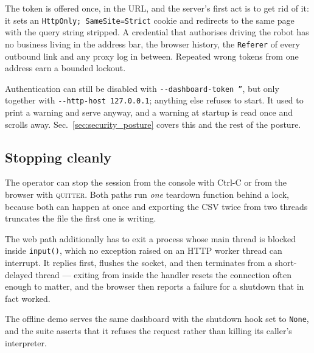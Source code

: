 The token is offered once, in the URL, and the server's first act is to
get rid of it: it sets an \texttt{HttpOnly; SameSite=Strict} cookie and
redirects to the same page with the query string stripped. A credential
that authorises driving the robot has no business living in the address
bar, the browser history, the \texttt{Referer} of every outbound link
and any proxy log in between. Repeated wrong tokens from one address
earn a bounded lockout.

Authentication can still be disabled with
\texttt{-{}-dashboard-token ''}, but only together with
\texttt{-{}-http-host 127.0.0.1}; anything else refuses to start. It
used to print a warning and serve anyway, and a warning at startup is
read once and scrolls away. Sec.~\ref{sec:security_posture} covers this
and the rest of the posture.

\subsection{Stopping cleanly}

The operator can stop the session from the console with Ctrl-C or from
the browser with \textsc{quitter}. Both paths run \emph{one} teardown
function behind a lock, because both can happen at once and exporting
the CSV twice from two threads truncates the file the first one is
writing.

The web path additionally has to exit a process whose main thread is
blocked inside \texttt{input()}, which no exception raised on an HTTP
worker thread can interrupt. It replies first, flushes the socket, and
then terminates from a short-delayed thread --- exiting from inside the
handler resets the connection often enough to matter, and the browser
then reports a failure for a shutdown that in fact worked.

The offline demo serves the same dashboard with the shutdown hook set to
\texttt{None}, and the suite asserts that it refuses the request rather
than killing its caller's interpreter.
